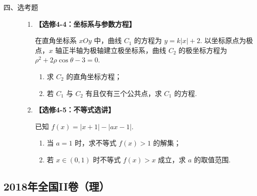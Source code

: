 \begin{description}

    \item[四、选考题]

    \begin{enumerate}[leftmargin=5pt]

      \addtocounter{enumi}{+21}

        \item \textbf{【选修4-4：坐标系与参数方程】}

在直角坐标系 \(xOy\) 中，曲线 \(C_1\) 的方程为 \(y=k|x|+2\). 以坐标原点为极点，\(x\) 轴正半轴为极轴建立极坐标系，曲线 \(C_2\) 的极坐标方程为 \(\rho^2+2\rho\cos\theta-3=0\).

\begin{enumerate}
\item 求 \(C_2\) 的直角坐标方程；
\item 若 \(C_1\) 与 \(C_2\) 有且仅有三个公共点，求 \(C_1\) 的方程.
\end{enumerate}

        \item \textbf{【选修4-5：不等式选讲】}

已知 \(f(x)=|x+1|-|ax-1|\).

\begin{enumerate}
\item 当 \(a=1\) 时，求不等式 \(f(x)>1\) 的解集；
\item 若 \(x\in(0,1)\) 时不等式 \(f(x)>x\) 成立，求 \(a\) 的取值范围.
\end{enumerate}

    \end{enumerate}

\end{description}


\subsection{2018年全国II卷（理）}\label{gk:2018年全国II卷（理）}

